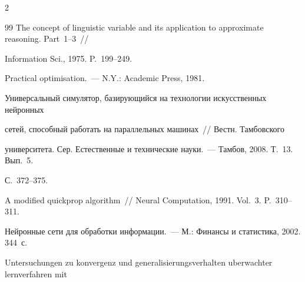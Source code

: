 \begin{multicols}{2}
{{\begin{thebibliography}{99}
The concept of linguistic variable and its application to approximate reasoning. Part~1--3~//


Information Sci., 1975. P.~199--249.









Practical optimisation.~--- N.Y.: Academic Press, 1981.









Универсальный симулятор, базирующийся на технологии искусственных нейронных


сетей, способный работать на параллельных машинах~// Вестн. Тамбовского


университета. Сер. Естественные и технические науки.~--- Тамбов, 2008. Т.~13. Вып.~5.


С.~372--375.









A modified quickprop algorithm~// Neural Computation, 1991. Vol.~3. P.~310--311.









Нейронные сети для обработки информации.~--- М.: Финансы и статистика, 2002. 344~с.














\label{end\stat}









Untersuchungen zu konvergenz und generalisierungsverhalten uberwachter lernverfahren mit



\end{thebibliography}}}
\end{multicols}
